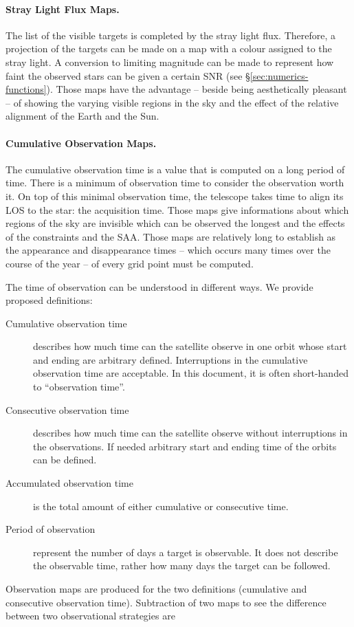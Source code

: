 \documentclass[a4paper,10pt]{article}
\begin{document}
\paragraph{Stray Light Flux Maps.} The list of the visible targets is completed by the stray light flux. Therefore, a projection of the targets can be made on a map with a colour assigned to the stray light. A conversion to limiting magnitude can be made to represent how faint the observed stars can be given a certain SNR (see \S\ref{sec:numerics-functions}). Those maps have the advantage -- beside being aesthetically pleasant -- of showing the varying visible regions in the sky and the effect of the relative alignment of the Earth and the Sun. 
\paragraph{Cumulative Observation Maps.} The cumulative observation time is a value that is computed on a long period of time. There is a minimum of observation time to consider the observation worth it. On top of this minimal observation time, the telescope takes time to align its LOS to the star: the acquisition time.
Those maps give informations about which regions of the sky are invisible which can be observed the longest and the effects of the constraints and the SAA. Those maps are relatively long to establish as the appearance and disappearance times -- which occurs many times over the course of the year -- of every grid point must be computed.

The time of observation can be understood in different ways. We provide proposed definitions:
\begin{description}
 \item [Cumulative observation time] describes how much time can the satellite observe in one orbit whose start and ending are arbitrary defined. Interruptions in the cumulative observation time are acceptable. In this document, it is often short-handed to ``observation time''.
 \item [Consecutive observation time] describes how much time can the satellite observe without interruptions in the observations. If needed arbitrary start and ending time of the orbits can be defined.
 \item [Accumulated observation time] is the total amount of either cumulative or consecutive time. 
 \item [Period of observation] represent the number of days a target is observable. It does not describe the observable time, rather how many days the target can be followed.
\end{description}
Observation maps are produced for the two definitions (cumulative and consecutive observation time). Subtraction of two maps to see the difference between two observational strategies are  
\end{document}

